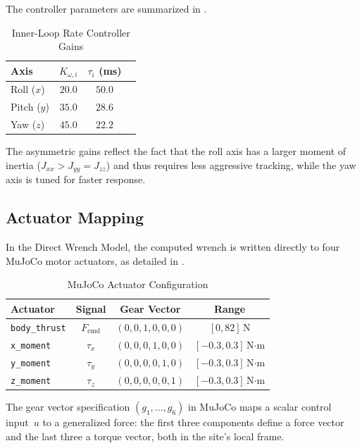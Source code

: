\documentclass[journal]{IEEEtran}
\begin{document}
The controller parameters are summarized in .

\begin{table}[!t]
  \centering
  \caption{Inner-Loop Rate Controller Gains}
  \label{tab:rate_gains}
  \begin{tabular}{@{}lccc@{}}
    \toprule
    Axis & $K_{\omega,i}$ & $\tau_i$ (\si{ms}) \\
    \midrule
    Roll ($x$) & $20.0$ & $50.0$ \\
    Pitch ($y$) & $35.0$ & $28.6$ \\
    Yaw ($z$) & $45.0$ & $22.2$ \\
    \bottomrule
  \end{tabular}
\end{table}

The asymmetric gains reflect the fact that the roll axis has a larger moment of inertia ($J_{xx} > J_{yy} = J_{zz}$) and thus requires less aggressive tracking, while the yaw axis is tuned for faster response.

\subsection{Actuator Mapping}

In the Direct Wrench Model, the computed wrench is written directly to four MuJoCo motor actuators, as detailed in .

\begin{table}[!t]
  \centering
  \caption{MuJoCo Actuator Configuration}
  \label{tab:actuators}
  \begin{tabular}{@{}lccc@{}}
    \toprule
    Actuator & Signal & Gear Vector & Range \\
    \midrule
    \texttt{body\_thrust} & $F_{\text{cmd}}$ & $(0,0,1,0,0,0)$ & $[0, 82]$\,N \\
    \texttt{x\_moment} & $\tau_x$ & $(0,0,0,1,0,0)$ & $[-0.3, 0.3]$\,N$\cdot$m \\
    \texttt{y\_moment} & $\tau_y$ & $(0,0,0,0,1,0)$ & $[-0.3, 0.3]$\,N$\cdot$m \\
    \texttt{z\_moment} & $\tau_z$ & $(0,0,0,0,0,1)$ & $[-0.3, 0.3]$\,N$\cdot$m \\
    \bottomrule
  \end{tabular}
\end{table}

The gear vector specification $(g_1, \ldots, g_6)$ in MuJoCo maps a scalar control input~$u$ to a generalized force: the first three components define a force vector and the last three a torque vector, both in the site's local frame.
\end{document}
